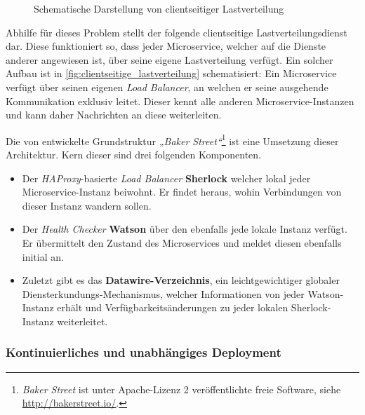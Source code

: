 \begin{figure}
	\caption{Schematische Darstellung von clientseitiger Lastverteilung}
	\label{fig:clientseitige_lastverteilung}
\end{figure}

Abhilfe für dieses Problem stellt der folgende clientseitige Lastverteilungsdienst dar. Diese funktioniert so, dass jeder Microservice, welcher auf die Dienste anderer angewiesen ist, über seine eigene Lastverteilung verfügt. Ein solcher Aufbau ist in \autoref{fig:clientseitige_lastverteilung} schematisiert: Ein Microservice verfügt über seinen eigenen \textit{Load Balancer}, an welchen er seine ausgehende Kommunikation exklusiv leitet. Dieser kennt alle anderen Microservice-Instanzen und kann daher Nachrichten an diese weiterleiten.

Die von \citeauthor{Li15} entwickelte Grundstruktur \textit{„Baker Street“}\footnote{\textit{Baker Street} ist unter Apache-Lizenz 2 veröffentlichte freie Software, siehe \url{http://bakerstreet.io/}.} ist eine Umsetzung dieser Architektur. Kern dieser sind drei folgenden Komponenten.

\begin{itemize}
	\item Der \textit{HAProxy}-basierte \textit{Load Balancer} \textbf{Sherlock} welcher lokal jeder Microservice-Instanz beiwohnt. Er findet heraus, wohin Verbindungen von dieser Instanz wandern sollen.
	
	\item Der \textit{Health Checker} \textbf{Watson} über den ebenfalls jede lokale Instanz verfügt. Er übermittelt den Zustand des Microservices und meldet diesen ebenfalls initial an.
	
	\item Zuletzt gibt es das \textbf{Datawire-Verzeichnis}, ein leichtgewichtiger globaler Diensterkundungs-Mechanismus, welcher Informationen von jeder Watson-Instanz erhält und Verfügbarkeitsänderungen zu jeder lokalen Sherlock-Instanz weiterleitet.
\end{itemize}

\subsubsection{Kontinuierliches und unabhängiges Deployment}